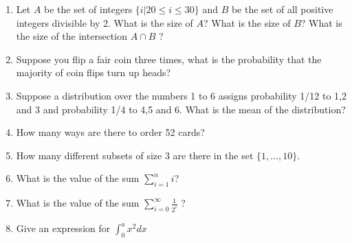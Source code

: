 \documentclass{report}
\theoremstyle{plain}
\theoremstyle{definition}
\begin{document}
\lecturer{}
\scribe{}

\maketitle

\begin{enumerate}
\item Let $A$ be the set of integers $\{i | 20 \leq i \leq 30\}$ and
  $B$ be the set of all positive integers divisible by 2. What is the
  size of $A$? What is the size of $B$? What is the size of the
  intersection $A \cap B$ ?
\item Suppose you flip a fair coin three times, what is the
  probability that the majority of coin flips turn up heads?
\item Suppose a distribution over the numbers 1 to 6 assigns
  probability 1/12 to 1,2 and 3 and probability 1/4 to 4,5 and 6. What
  is the mean of the distribution?
\item How many ways are there to order 52 cards?
\item How many different subsets of size 3 are there in the set
  $\{1,\ldots,10\}$.
\item What is the value of the sum $\sum_{i=1}^n i$?
\item What is the value of the sum $\sum_{i=0}^{\infty} \frac{1}{2^i}$
  ?
\item Give an expression for $\int_0^a x^2 dx$
\end{enumerate}
\end{document}
